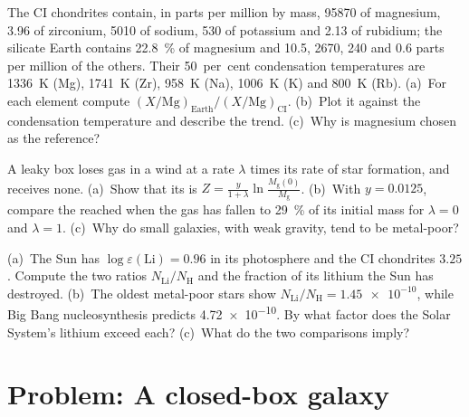 \begin{exercise}[$\star\star\star$]\label{exo:b3:origin-of-elements:10}
The CI chondrites contain, in parts per million by mass, \num{95870}
of magnesium, \num{3.96} of zirconium, \num{5010} of sodium, \num{530}
of potassium and \num{2.13} of rubidium; the silicate Earth contains
\qty{22.8}{\percent} of magnesium and \num{10.5}, \num{2670}, \num{240}
and \num{0.6} parts per million of the others. Their 50~per~cent
condensation temperatures are \qty{1336}{K} (Mg), \qty{1741}{K} (Zr),
\qty{958}{K} (Na), \qty{1006}{K} (K) and \qty{800}{K} (Rb). (a)~For
each element compute $(X/\mathrm{Mg})_\mathrm{Earth}/(X/\mathrm{Mg})_\mathrm{CI}$.
(b)~Plot it against the condensation temperature and describe the
trend. (c)~Why is magnesium chosen as the reference?
\end{exercise}

\begin{exercise}[$\star\star\star$]\label{exo:b3:origin-of-elements:11}
A leaky box loses gas in a wind at a rate $\lambda$ times its rate of
star formation, and receives none. (a)~Show that its  is
$Z = \frac{y}{1 + \lambda}\ln\frac{M_\mathrm{g}(0)}{M_\mathrm{g}}$.
(b)~With $y = 0.0125$, compare the  reached when the gas has
fallen to \qty{29}{\percent} of its initial mass for $\lambda = 0$ and
$\lambda = 1$. (c)~Why do small galaxies, with weak gravity, tend to be
metal-poor?
\end{exercise}

\begin{exercise}[$\star\star\star$]\label{exo:b3:origin-of-elements:12}
(a)~The Sun has $\log\varepsilon(\mathrm{Li}) = 0.96$ in its photosphere
and the CI chondrites $3.25$. Compute the two ratios $N_\mathrm{Li}/N_\mathrm{H}$
and the fraction of its lithium the Sun has destroyed. (b)~The oldest
metal-poor stars show $N_\mathrm{Li}/N_\mathrm{H} = \num{1.45e-10}$,
while Big Bang nucleosynthesis predicts \num{4.72e-10}. By what factor
does the Solar System's lithium exceed each? (c)~What do the two
comparisons imply?
\end{exercise}

\section{Problem: A closed-box galaxy}

